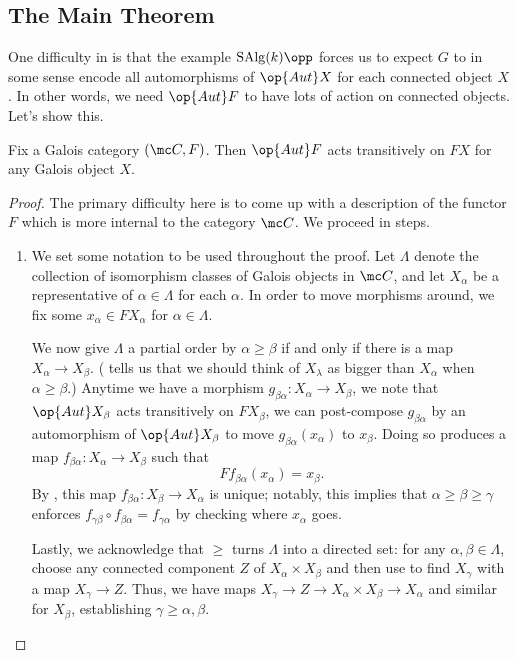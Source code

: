 \documentclass{amsart}
\begin{document}
\subsection{The Main Theorem}
One difficulty in  is that the example $\mathrm{SAlg}(k)\opp$ forces us to expect $G$ to in some sense encode all automorphisms of $\op{Aut}X$ for each connected object $X$. In other words, we need $\op{Aut}F$ to have lots of action on connected objects. Let's show this.
\begin{proposition} \label{prop:galois-transitive}
    Fix a Galois category $(\mc C,F)$. Then $\op{Aut}F$ acts transitively on $FX$ for any Galois object $X$.
\end{proposition}
\begin{proof}
    The primary difficulty here is to come up with a description of the functor $F$ which is more internal to the category $\mc C$. We proceed in steps.
    \begin{enumerate}
        \item We set some notation to be used throughout the proof. Let $\Lambda$ denote the collection of isomorphism classes of Galois objects in $\mc C$, and let $X_\alpha$ be a representative of $\alpha\in\Lambda$ for each $\alpha$. In order to move morphisms around, we fix some $x_\alpha\in FX_\alpha$ for $\alpha\in\Lambda$.

        We now give $\Lambda$ a partial order by $\alpha\ge\beta$ if and only if there is a map $X_\alpha\to X_{\beta}$. ( tells us that we should think of $X_\lambda$ as bigger than $X_{\alpha}$ when $\alpha\ge\beta$.) Anytime we have a morphism $g_{\beta\alpha}\colon X_\alpha\to X_{\beta}$, we note that $\op{Aut}X_{\beta}$ acts transitively on $FX_{\beta}$, we can post-compose $g_{\beta\alpha}$ by an automorphism of $\op{Aut}X_{\beta}$ to move $g_{\beta\alpha}(x_\alpha)$ to $x_{\beta}$. Doing so produces a map $f_{\beta\alpha}\colon X_\alpha\to X_{\beta}$ such that
        \[Ff_{\beta\alpha}(x_\alpha)=x_{\beta}.\]
        By , this map $f_{\beta\alpha}\colon X_{\beta}\to X_\alpha$ is unique; notably, this implies that $\alpha\ge\beta\ge\gamma$ enforces $f_{\gamma\beta}\circ f_{\beta\alpha}=f_{\gamma\alpha}$ by checking where $x_\alpha$ goes.

        Lastly, we acknowledge that $\ge$ turns $\Lambda$ into a directed set: for any $\alpha,\beta\in\Lambda$, choose any connected component $Z$ of $X_\alpha\times X_\beta$ and then use  to find $X_\gamma$ with a map $X_\gamma\to Z$. Thus, we have maps $X_\gamma\to Z\to X_\alpha\times X_\beta\to X_\alpha$ and similar for $X_\beta$, establishing $\gamma\ge\alpha,\beta$.


\end{enumerate}
\end{proof}
\end{document}

